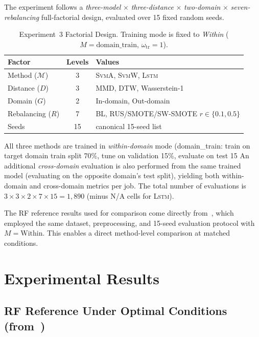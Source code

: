 \documentclass[lettersize,journal]{IEEEtran}
\newcommand{\Impl}[1]{\textsc{#1}}
\begin{document}
The experiment follows a \emph{three-model} $\times$ \emph{three-distance} $\times$ \emph{two-domain} $\times$ \emph{seven-rebalancing} full-factorial design, evaluated over 15 fixed random seeds.

\begin{table}[!t]
\caption{Experiment~3 Factorial Design. Training mode is fixed to \emph{Within} ($M = \mathrm{domain\_train}$, $\omega_{\mathrm{tr}} = 1$).\label{tab:design}}
\centering
\footnotesize
\begin{tabular}{|l|c|p{3.6cm}|}
\hline
Factor & Levels & Values \\
\hline
Method ($\mathcal{M}$) & 3 & \Impl{SvmA}, \Impl{SvmW}, \Impl{Lstm} \\
\hline
Distance ($D$) & 3 & MMD, DTW, Wasserstein-1 \\
\hline
Domain ($G$) & 2 & In-domain, Out-domain \\
\hline
Rebalancing ($R$) & 7 & BL, RUS/SMOTE/SW-SMOTE $r\!\in\!\{0.1,0.5\}$ \\
\hline
Seeds & 15 & canonical 15-seed list \\
\hline
\end{tabular}
\end{table}

All three methods are trained in \emph{within-domain} mode (domain\_train: train on target domain train split 70\%, tune on validation 15\%, evaluate on test 15%
An additional \emph{cross-domain} evaluation is also performed from the same trained model (evaluating on the opposite domain's test split), yielding both within-domain and cross-domain metrics per job.
The total number of evaluations is $3 \times 3 \times 2 \times 7 \times 15 = 1{,}890$ (minus N/A cells for \Impl{Lstm}).

The RF reference results used for comparison come directly from~\cite{nakagama2026tiv}, which employed the same dataset, preprocessing, and 15-seed evaluation protocol with $M = \mathrm{Within}$.
This enables a direct method-level comparison at matched conditions.

\section{Experimental Results}
\label{sec:results}

\subsection{RF Reference Under Optimal Conditions (from~\cite{nakagama2026tiv})}
\label{sec:rf_reference}
\end{document}
